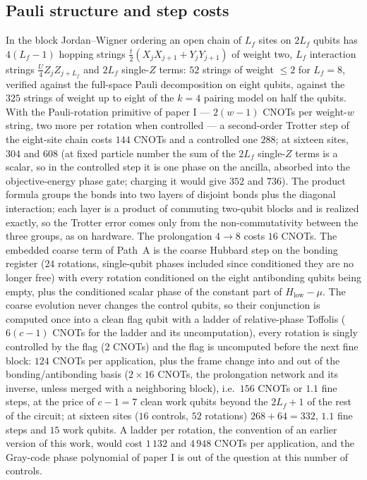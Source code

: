 \documentclass[a4paper,11pt,noarxiv]{quantumarticle}
\newcommand{\Hlow}{H_{\mathrm{low}}}
\begin{document}
\subsection{Pauli structure and step costs}
In the block Jordan--Wigner ordering an open chain of $L_f$ sites on $2L_f$
qubits has $4(L_f-1)$ hopping strings $\tfrac t2(X_jX_{j+1}+Y_jY_{j+1})$ of
weight two, $L_f$ interaction strings $\tfrac U4Z_jZ_{j+L_f}$ and $2L_f$
single-$Z$ terms: $52$ strings of weight $\le2$ for $L_f=8$, verified
against the full-space Pauli decomposition on eight qubits, against the
$325$ strings of weight up to eight of the $k=4$ pairing model on half the
qubits.  With the Pauli-rotation primitive of paper I --- $2(w-1)$ CNOTs per
weight-$w$ string, two more per rotation when controlled --- a second-order
Trotter step of the eight-site chain costs $144$ CNOTs and a controlled one
$288$; at sixteen sites, $304$ and $608$ (at fixed particle number the sum
of the $2L_f$ single-$Z$ terms is a scalar, so in the controlled step it is
one phase on the ancilla, absorbed into the objective-energy phase gate;
charging it would give $352$ and $736$).  The product formula groups the
bonds into two layers of disjoint bonds plus the diagonal interaction; each
layer is a product of commuting two-qubit blocks and is realized exactly, so
the Trotter error comes only from the non-commutativity between the three
groups, as on hardware.  The prolongation $4\to8$ costs $16$ CNOTs.  The
embedded coarse term of Path~A is the coarse Hubbard step on the bonding
register ($24$ rotations, single-qubit phases included since conditioned
they are no longer free) with every rotation conditioned on the eight
antibonding qubits being empty, plus the conditioned scalar phase of the
constant part of $\Hlow-\mu$.  The coarse evolution never changes the
control qubits, so their conjunction is computed once into a clean flag
qubit with a ladder of relative-phase Toffolis ($6(c-1)$ CNOTs for the
ladder and its uncomputation), every rotation is singly controlled by the
flag ($2$ CNOTs) and the flag is uncomputed before the next fine block:
$124$ CNOTs per application, plus the frame change into and out of the
bonding/antibonding basis ($2\times16$ CNOTs, the prolongation network and
its inverse, unless merged with a neighboring block), i.e.\ $156$ CNOTs or
$1.1$ fine steps, at the price of $c-1=7$ clean work qubits beyond the
$2L_f+1$ of the rest of the circuit; at sixteen sites ($16$ controls, $52$
rotations) $268+64=332$, $1.1$ fine steps and $15$ work qubits.  A ladder
per rotation, the convention of an earlier version of this work, would cost
$1\,132$ and $4\,948$ CNOTs per application, and the Gray-code phase
polynomial of paper I is out of the question at this number of controls.
\end{document}
